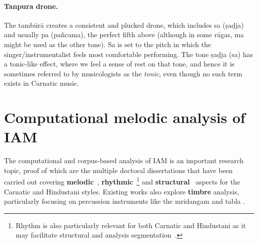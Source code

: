 
\paragraph*{Tanpura drone.}
The tambūrā creates a consistent and plucked drone, which includes sa (ṣaḍja) and usually pa (pañcama), the perfect fifth above (although in some rāgas, ma might be used as the other tone). Sa is set to the pitch in which the singer/instrumentalist feels most comfortable performing.
The tone ṣaḍja (sa) has a tonic-like effect, where we feel a sense of rest on that tone, and hence it is sometimes referred to by musicologists as the \textit{tonic}, even though no such term exists in Carnatic music.






\section{Computational melodic analysis of IAM}\label{ch02_sb:sec:computational-carnatic}
The computational and corpus-based analysis of \acrshort{IAM} is an important research topic, proof of which are the multiple doctoral dissertations that have been carried out covering \textbf{melodic}~\citep{gulati-thesis,gopala-thesis,ross-thesis}, \textbf{rhythmic}~\citep{ajay-thesis}\footnote{Rhythm is also particularly relevant for both Carnatic and Hindustani as it may facilitate structural and analysis segmentation~\citep{rao-dhrupad}.} and \textbf{structural}~\citep{ranjani-thesis} aspects for the Carnatic and Hindustani styles. Existing works also explore \textbf{timbre} analysis, particularly focusing on percussion instruments like the mridangam and tabla \citep{anantapadmanabhan-mridangam_1,anantapadmanabhan-mridangam_2,rohit-tabla}.
%

